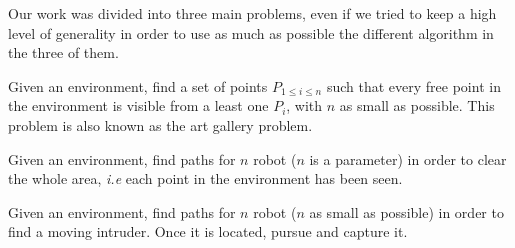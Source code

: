 Our work was divided into three main problems, even if we tried to keep a high level of generality in order to use as much as possible the different algorithm in the three of them.

\begin{problem}
Given an environment, find a set of points $P_{1\leq i \leq n}$ such that every free point in the environment is visible from a least one $P_i$, with $n$ as small as possible. This problem is also known as the art gallery problem.
\end{problem}
\begin{problem}
Given an environment, find paths for $n$ robot ($n$ is a parameter) in order to clear the whole area, \emph{i.e} each point in the environment has been seen.
\end{problem}
\begin{problem}
Given an environment, find paths for $n$ robot ($n$ as small as possible) in order to find a moving intruder. Once it is located, pursue and capture it.
\end{problem}